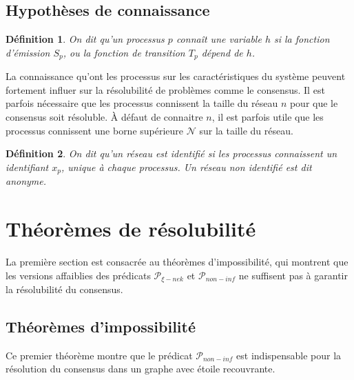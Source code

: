\documentclass{article}
\newtheorem{definition}{Définition}
\begin{document}
\subsection{Hypothèses de connaissance}

\begin{definition}
	On dit qu'un processus $p$ \textit{connaît} une variable $h$ si la fonction d'émission $S_p$, ou la fonction de transition $T_p$ dépend de $h$. 
\end{definition}

La connaissance qu'ont les processus sur les caractéristiques du système peuvent fortement influer sur la résolubilité de problèmes comme le consensus.
Il est parfois nécessaire que les processus connissent la taille du réseau $n$ pour que le consensus soit résoluble.
À défaut de connaitre $n$, il est parfois utile que les processus connissent une borne supérieure $\mathcal{N}$ sur la taille du réseau.

\begin{definition}
	On dit qu'un réseau est \textit{identifié} si les processus connaissent un identifiant $x_p$, unique à chaque processus.
	Un réseau non identifié est dit \textit{anonyme}.
\end{definition}

\section{Théorèmes de résolubilité}

La première section est consacrée au théorèmes d'impossibilité, qui montrent que les versions affaiblies des prédicats $\mathcal{P}_{\xi-nek}$ et $\mathcal{P}_{non-inf}$ ne suffisent
pas à garantir la résolubilité du consensus.

\subsection{Théorèmes d'impossibilité}

Ce premier théorème montre que le prédicat $\mathcal{P}_{non-inf}$ est indispensable pour la résolution du consensus dans un graphe avec étoile recouvrante.
\end{document}
